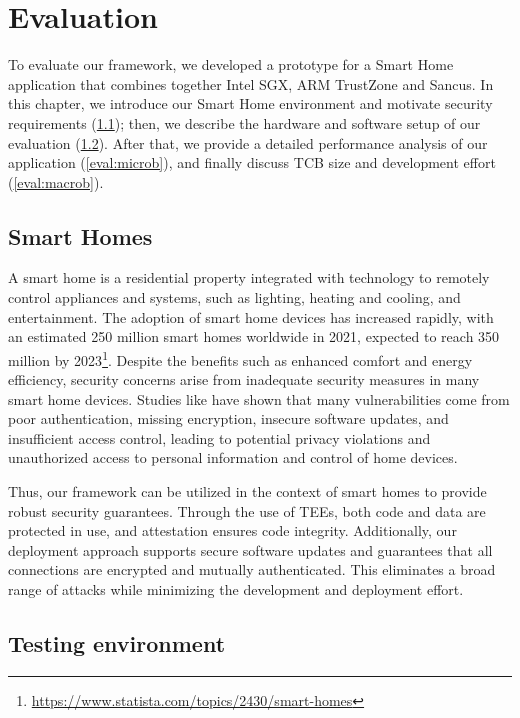 \section{Evaluation}
\label{sec:evaluation}

To evaluate our framework, we developed a prototype for a Smart Home application
that combines together Intel \ac{SGX}, ARM TrustZone and Sancus. In this
chapter, we  introduce our Smart Home environment and motivate security
requirements (\cref{eval:intro}); then, we describe the hardware and software
setup of our evaluation (\cref{eval:test-env}). After that, we provide a
detailed performance analysis of our application (\cref{eval:microb}), and
finally discuss \ac{TCB} size and development effort (\cref{eval:macrob}).

\subsection{Smart Homes}
\label{eval:intro}

A smart home is a residential property integrated with technology to remotely
control appliances and systems, such as lighting, heating and cooling, and
entertainment. The adoption of smart home devices has increased rapidly, with an
estimated 250 million smart homes worldwide in 2021, expected to reach 350
million by
2023\footnote{\url{https://www.statista.com/topics/2430/smart-homes}}. Despite
the benefits such as enhanced comfort and energy efficiency, security concerns
arise from inadequate security measures in many smart home devices. Studies like
\cite{davis2020vulnerability} have shown that many vulnerabilities come from
poor authentication, missing encryption, insecure software updates, and
insufficient access control, leading to potential privacy violations and
unauthorized access to personal information and control of home devices.

Thus, our framework can be utilized in the context of smart homes to provide
robust security guarantees. Through the use of \acp{TEE}, both code and data are
protected in use, and attestation ensures code integrity. Additionally, our
deployment approach supports secure software updates and guarantees that all
connections are encrypted and mutually authenticated. This eliminates a broad
range of attacks while minimizing the development and deployment effort.

\subsection{Testing environment}
\label{eval:test-env}

